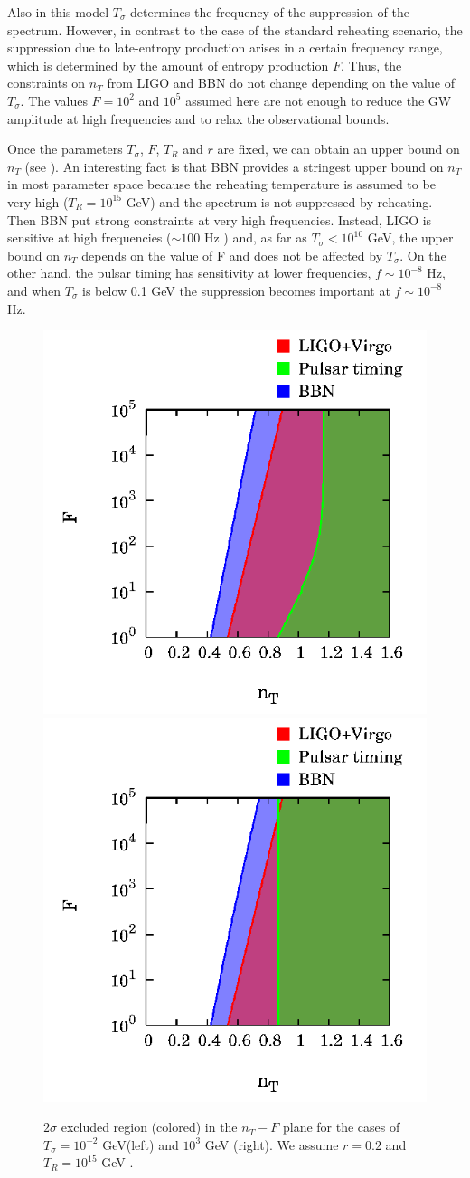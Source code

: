 \documentclass[11pt,a4paper,twoside]{book}
\begin{document}
Also in this model $ T_{\sigma} $ determines the frequency of the suppression of the spectrum. However, in contrast to the case of the standard reheating scenario, the suppression due to late-entropy production arises in a certain frequency range, which is determined by the amount of entropy production $ F $. Thus, the constraints on $ n_{T} $ from LIGO and BBN do not change depending on the value of $ T_{\sigma} $. The values $ F=10^{2} $ and $ 10^{5} $ assumed here are not enough to reduce the GW amplitude at high frequencies and to relax the observational bounds.

 Once the parameters $ T_{\sigma} $, $ F $, $ T_{R} $ and $ r $ are fixed, we can obtain an upper bound on $ n_{T} $ (see \cite{Chap3:BlueTiltedSpectrum}). An interesting fact is that BBN provides a stringest upper bound on $ n_{T} $ in most parameter space because the reheating temperature is assumed to be very high ($ T_{R}=10^{15} $ GeV) and the spectrum is not suppressed by reheating. Then BBN put strong constraints at very high frequencies. Instead, LIGO is sensitive at high frequencies ($\sim 100$ Hz ) and, as far as $ T_{\sigma} < 10^{10} $ GeV, the upper bound on $ n_{T} $ depends on the value of F and does not be affected by $ T_{\sigma} $. On the other hand, the pulsar timing has sensitivity at lower frequencies, $ f\sim 10^{-8} $ Hz, and when $ T_{\sigma} $ is below 0.1 GeV the suppression  becomes important at $ f\sim 10^{-8} $ Hz. 
\begin{figure}[h]
	\centering
	\includegraphics[width=0.45\linewidth, height=0.3\textheight]{Images/Chap3/Kurojanagi_Takahashi_Fig4A}
		\includegraphics[width=0.45\linewidth, height=0.3\textheight]{Images/Chap3/Kurojanagi_Takahashi_Fig4B}
	\caption{$ 2\sigma $ excluded region (colored) in the $ n_{T}-F $ plane for the cases of $ T_{\sigma}=10^{-2} $ GeV(left) and $ 10^{3} $ GeV (right). We assume $ r=0.2 $ and $ T_{R}=10^{15} $ GeV \cite{Chap3:BlueTiltedSpectrum}. }
	\label{fig:kurojanagitakahashifig4a}
\end{figure}
\end{document}
